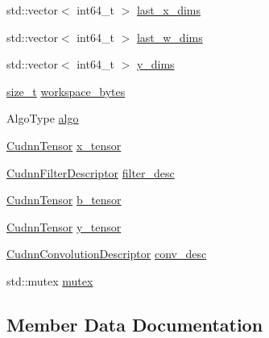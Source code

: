 \begin{DoxyCompactItemize}
\item 
std\+::vector$<$ int64\+\_\+t $>$ \mbox{\hyperlink{structonnxruntime_1_1cuda_1_1CudnnConvState_abb6f987de8392aa5e92cda4d01cc3d46}{last\+\_\+x\+\_\+dims}}
\item 
std\+::vector$<$ int64\+\_\+t $>$ \mbox{\hyperlink{structonnxruntime_1_1cuda_1_1CudnnConvState_a2e5dca00d0c047f65dda3604d38fa74c}{last\+\_\+w\+\_\+dims}}
\item 
std\+::vector$<$ int64\+\_\+t $>$ \mbox{\hyperlink{structonnxruntime_1_1cuda_1_1CudnnConvState_a04e5b53d56e214e67efaa2125bb908ff}{y\+\_\+dims}}
\item 
\mbox{\hyperlink{mlasi_8h_a503efbc1c6e50825320ad909366b78ab}{size\+\_\+t}} \mbox{\hyperlink{structonnxruntime_1_1cuda_1_1CudnnConvState_a9ee27988a233e86333602f53c0604d13}{workspace\+\_\+bytes}}
\item 
Algo\+Type \mbox{\hyperlink{structonnxruntime_1_1cuda_1_1CudnnConvState_a7cc81dcffd6af6c52e73146a4acbf9ce}{algo}}
\item 
\mbox{\hyperlink{classonnxruntime_1_1cuda_1_1CudnnTensor}{Cudnn\+Tensor}} \mbox{\hyperlink{structonnxruntime_1_1cuda_1_1CudnnConvState_aeffe1e221d15d748996bf594cb300360}{x\+\_\+tensor}}
\item 
\mbox{\hyperlink{classonnxruntime_1_1cuda_1_1CudnnFilterDescriptor}{Cudnn\+Filter\+Descriptor}} \mbox{\hyperlink{structonnxruntime_1_1cuda_1_1CudnnConvState_abaef91b21d1779d5fdc67e81f49d43d4}{filter\+\_\+desc}}
\item 
\mbox{\hyperlink{classonnxruntime_1_1cuda_1_1CudnnTensor}{Cudnn\+Tensor}} \mbox{\hyperlink{structonnxruntime_1_1cuda_1_1CudnnConvState_a608414be81a9adb6e9b7365cb0617f67}{b\+\_\+tensor}}
\item 
\mbox{\hyperlink{classonnxruntime_1_1cuda_1_1CudnnTensor}{Cudnn\+Tensor}} \mbox{\hyperlink{structonnxruntime_1_1cuda_1_1CudnnConvState_aebb7cdf4e79a3d5ee09ad81240ca3a97}{y\+\_\+tensor}}
\item 
\mbox{\hyperlink{classonnxruntime_1_1cuda_1_1CudnnConvolutionDescriptor}{Cudnn\+Convolution\+Descriptor}} \mbox{\hyperlink{structonnxruntime_1_1cuda_1_1CudnnConvState_aa7023eff86ef94dfea1f60e8c53b3dcd}{conv\+\_\+desc}}
\item 
std\+::mutex \mbox{\hyperlink{structonnxruntime_1_1cuda_1_1CudnnConvState_ac6cbeba0fac30da677f4763a0effa052}{mutex}}
\end{DoxyCompactItemize}


\subsection{Member Data Documentation}
\mbox{\label{structonnxruntime_1_1cuda_1_1CudnnConvState_a7cc81dcffd6af6c52e73146a4acbf9ce}} 
